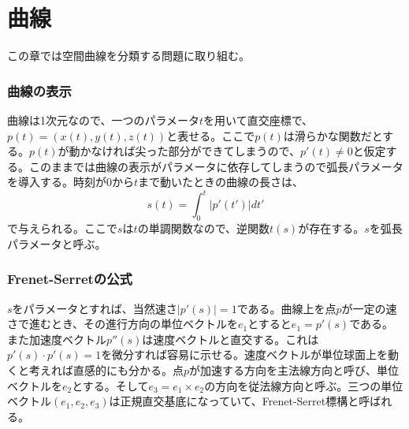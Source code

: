 \part{曲線}

この章では空間曲線を分類する問題に取り組む。
\section{曲線の表示}
    曲線は1次元なので、一つのパラメータ$t$を用いて直交座標で、$p(t)=(x(t),y(t),z(t))$と表せる。ここで$p(t)$は滑らかな関数だとする。$p(t)$が動かなければ尖った部分ができてしまうので、$p'(t)\neq 0$と仮定する。このままでは曲線の表示がパラメータに依存してしまうので弧長パラメータを導入する。時刻が0から$t$まで動いたときの曲線の長さは、
        \[s(t) = \int_0^t |p'(t')|dt'\]
    で与えられる。ここで$s$は$t$の単調関数なので、逆関数$t(s)$が存在する。$s$を弧長パラメータと呼ぶ。

\section{Frenet-Serretの公式}
    $s$をパラメータとすれば、当然速さ$|p'(s)| = 1$である。曲線上を点$p$が一定の速さで進むとき、その進行方向の単位ベクトルを$e_1$とすると$e_1 = p'(s)$である。また加速度ベクトル$p''(s)$は速度ベクトルと直交する。これは$p'(s)\cdot p'(s) = 1$を微分すれば容易に示せる。速度ベクトルが単位球面上を動くと考えれば直感的にも分かる。点$p$が加速する方向を主法線方向と呼び、単位ベクトルを$e_2$とする。そして$e_3 = e_1\times e_2$の方向を従法線方向と呼ぶ。三つの単位ベクトル$(e_1,e_2,e_3)$は正規直交基底になっていて、Frenet-Serret標構と呼ばれる。


